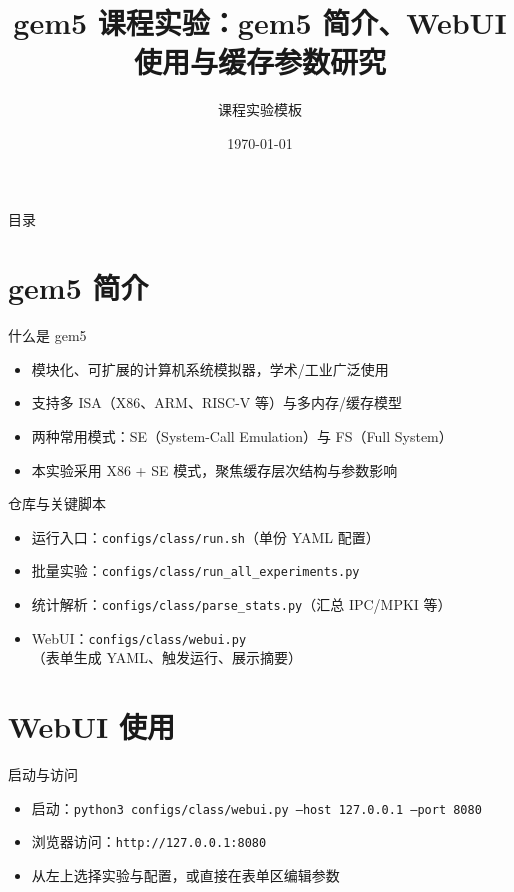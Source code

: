 \documentclass[aspectratio=169]{beamer}
\title{gem5 课程实验：gem5 简介、WebUI 使用与缓存参数研究}
\author{课程实验模板}
\institute{\texttt{configs/class}}
\date{\today}
\begin{document}
\begin{frame}
  \titlepage
\end{frame}

\begin{frame}{目录}
  \tableofcontents
\end{frame}

\section{gem5 简介}

\begin{frame}{什么是 gem5}
  \begin{itemize}
    \item 模块化、可扩展的计算机系统模拟器，学术/工业广泛使用
    \item 支持多 ISA（X86、ARM、RISC-V 等）与多内存/缓存模型
    \item 两种常用模式：SE（System-Call Emulation）与 FS（Full System）
    \item 本实验采用 X86 + SE 模式，聚焦缓存层次结构与参数影响
  \end{itemize}
\end{frame}

\begin{frame}{仓库与关键脚本}
  \begin{itemize}
    \item 运行入口：\texttt{configs/class/run.sh}（单份 YAML 配置）
    \item 批量实验：\texttt{configs/class/run_all_experiments.py}
    \item 统计解析：\texttt{configs/class/parse_stats.py}（汇总 IPC/MPKI 等）
    \item WebUI：\texttt{configs/class/webui.py}（表单生成 YAML、触发运行、展示摘要）
  \end{itemize}
\end{frame}

\section{WebUI 使用}

\begin{frame}{启动与访问}
  \begin{itemize}
    \item 启动：\texttt{python3 configs/class/webui.py --host 127.0.0.1 --port 8080}
    \item 浏览器访问：\texttt{http://127.0.0.1:8080}
    \item 从左上选择实验与配置，或直接在表单区编辑参数
  \end{itemize}
\end{frame}
\end{document}
